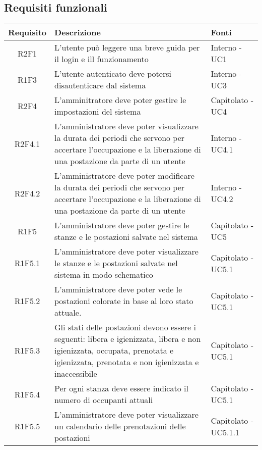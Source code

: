 \subsection{Requisiti funzionali}
\begin{center}
	\begin{longtable}{|c|p{10cm}|p{4cm}|}
		\hline
		\rowcolor{lighter-grayer}
		\textbf{Requisito} & \textbf{Descrizione} & \textbf{Fonti}  \\
		\hline
		\endfirsthead
		
		 R2F1 & L'utente può leggere una breve guida per il login e ill funzionamento & Interno - UC1 \\
		\hline
		R1F3	&	L'utente autenticato deve potersi disautenticare dal sistema& Interno - UC3	\\
		\hline
		R2F4	&L'amminitratore deve poter gestire le impostazioni del sistema	& Capitolato - UC4	\\
					\hline
		R2F4.1	&	L'amministratore deve poter visualizzare la durata dei periodi che servono per accertare l'occupazione e la liberazione di una postazione da parte di un utente& Interno - UC4.1	\\
					\hline
			R2F4.2&L'amministratore deve poter modificare la durata dei periodi che servono per accertare l'occupazione e la liberazione di una postazione da parte di un utente	&Interno - UC4.2 	\\
					\hline
			R1F5&L'amministratore deve poter gestire le stanze e le postazioni salvate nel sistema	& Capitolato - UC5	\\
					\hline
			R1F5.1&L'amministratore deve poter visualizzare le stanze e le postazioni salvate nel sistema in modo schematico	& Capitolato - UC5.1	\\
					\hline
			R1F5.2&	L'amministratore deve poter vede le postazioni colorate in base al loro stato attuale.& Capitolato - UC5.1	\\
					\hline
			R1F5.3&	Gli stati delle postazioni devono essere i seguenti: libera e igienizzata, libera e non igienizzata, occupata, prenotata e igienizzata, prenotata e non igienizzata e inaccessibile& 	Capitolato - UC5.1\\
					\hline
			R1F5.4&Per ogni stanza deve essere indicato il numero di occupanti attuali	& Capitolato - UC5.1	\\
					\hline
			R1F5.5&L'amministratore deve poter visualizzare un calendario delle prenotazioni delle postazioni	& Capitolato - UC5.1.1	\\

\end{longtable}
\end{center}
